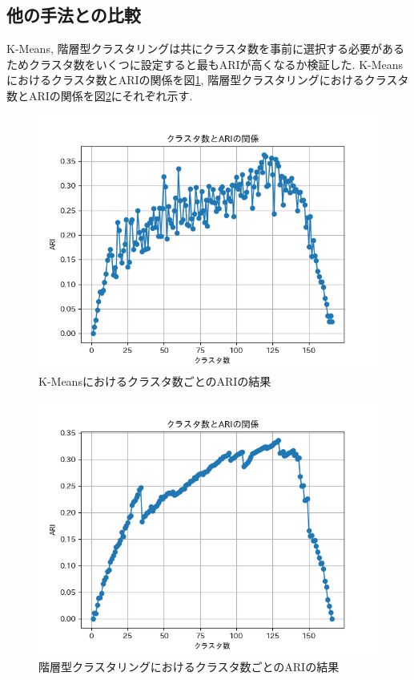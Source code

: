 \subsection{他の手法との比較}

K-Means, 階層型クラスタリングは共にクラスタ数を事前に選択する必要があるためクラスタ数をいくつに設定すると最もARIが高くなるか検証した. 
K-Meansにおけるクラスタ数とARIの関係を図\ref{fig:kmeans_graph}, 階層型クラスタリングにおけるクラスタ数とARIの関係を図\ref{fig:agg_graph}にそれぞれ示す.

\begin{figure}[H]
  \centering
  \includegraphics[scale=0.8]
    {contents/images/kmeans_graph.png}
  \caption{K-Meansにおけるクラスタ数ごとのARIの結果\label{fig:kmeans_graph}}
\end{figure}

\begin{figure}[H]
  \centering
  \includegraphics[scale=0.8]
    {contents/images/agg_graph.png}
  \caption{階層型クラスタリングにおけるクラスタ数ごとのARIの結果\label{fig:agg_graph}}
\end{figure}


